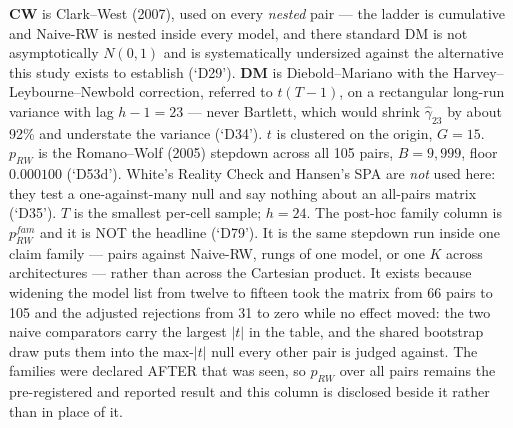 \begin{table}[!t]
\vspace{2pt}\par\footnotesize \textbf{CW} is Clark--West (2007), used on every \emph{nested} pair --- the ladder is cumulative and Naive-RW is nested inside every model, and there standard DM is not asymptotically $N(0,1)$ and is systematically undersized against the alternative this study exists to establish (`D29'). \textbf{DM} is Diebold--Mariano with the Harvey--Leybourne--Newbold correction, referred to $t(T-1)$, on a rectangular long-run variance with lag $h-1 = 23$ --- never Bartlett, which would shrink $\hat\gamma_{23}$ by about 92\% and understate the variance (`D34'). $t$ is clustered on the origin, $G = 15$. $p_{RW}$ is the Romano--Wolf (2005) stepdown across all 105 pairs, $B = 9,999$, floor $0.000100$ (`D53d'). White's Reality Check and Hansen's SPA are \emph{not} used here: they test a one-against-many null and say nothing about an all-pairs matrix (`D35'). $T$ is the smallest per-cell sample; $h = 24$. The post-hoc family column is $p_{RW}^{fam}$ and it is NOT the headline (`D79'). It is the same stepdown run inside one claim family --- pairs against Naive-RW, rungs of one model, or one $K$ across architectures --- rather than across the Cartesian product. It exists because widening the model list from twelve to fifteen took the matrix from 66 pairs to 105 and the adjusted rejections from 31 to zero while no effect moved: the two naive comparators carry the largest $|t|$ in the table, and the shared bootstrap draw puts them into the max-$|t|$ null every other pair is judged against. The families were declared AFTER that was seen, so $p_{RW}$ over all pairs remains the pre-registered and reported result and this column is disclosed beside it rather than in place of it.
\end{table}
